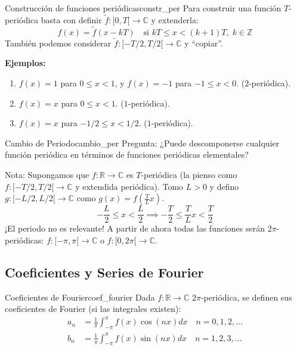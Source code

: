 \begin{nota}{Construcción de funciones periódicas}{constr_per}
Para construir una función $T$-periódica basta con definir $\tilde{f}: [0, T[ \to \mathbb{C}$ y extenderla:
$$ f(x) = \tilde{f}(x - kT) \quad \text{si } kT \le x < (k+1)T, \; k \in \mathbb{Z} $$
También podemos considerar $\tilde{f}: [-T/2, T/2[ \to \mathbb{C}$ y ``copiar''.

\textbf{Ejemplos:}
\begin{enumerate}
    \item $f(x) = 1$ para $0 \le x < 1$, y $f(x) = -1$ para $-1 \le x < 0$. ($2$-periódica).
    \item $f(x) = x$ para $0 \le x < 1$. ($1$-periódica).
    \item $f(x) = x$ para $-1/2 \le x < 1/2$. ($1$-periódica).
\end{enumerate}
\end{nota}

\begin{observacion}{Cambio de Periodo}{cambio_per}
Pregunta: ¿Puede descomponerse cualquier función periódica en términos de funciones periódicas elementales?

Nota: Supongamos que $f: \mathbb{R} \to \mathbb{C}$ es $T$-periódica (la pienso como $f: [-T/2, T/2[ \to \mathbb{C}$ y extendida periódica). Tomo $L > 0$ y defino $g: [-L/2, L/2[ \to \mathbb{C}$ como $g(x) = f\left(\frac{T}{L}x\right)$.
$$ -\frac{L}{2} \le x < \frac{L}{2} \implies -\frac{T}{2} \le \frac{T}{L}x < \frac{T}{2} $$
¡El periodo no es relevante! A partir de ahora todas las funciones serán $2\pi$-periódicas:
$f: [-\pi, \pi[ \to \mathbb{C}$ o $f: [0, 2\pi[ \to \mathbb{C}$.
\end{observacion}

\subsection{Coeficientes y Series de Fourier}

\begin{definicion}{Coeficientes de Fourier}{coef_fourier}
Dada $f: \mathbb{R} \to \mathbb{C}$ $2\pi$-periódica, se definen sus coeficientes de Fourier (si las integrales existen):
\begin{align*}
    a_n &= \frac{1}{\pi} \int_{-\pi}^{\pi} f(x) \cos(nx) dx \quad n = 0, 1, 2, \dots \\
    b_n &= \frac{1}{\pi} \int_{-\pi}^{\pi} f(x) \sin(nx) dx \quad n = 1, 2, 3, \dots
\end{align*}
\end{definicion}

